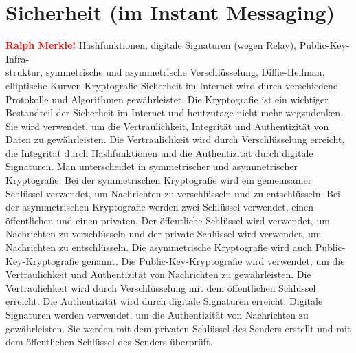 \section{Sicherheit (im Instant Messaging)}
\label{sec:sicherheit_im}
\textbf{\textcolor{red}{Ralph Merkle!}}
Hashfunktionen, digitale Signaturen (wegen Relay), Public-Key-Infra-\\struktur, symmetrische und asymmetrische Verschlüsselung, Diffie-Hellman, elliptische Kurven Kryptografie
Sicherheit im Internet wird durch verschiedene Protokolle und Algorithmen gewährleistet. Die Kryptografie ist ein wichtiger Bestandteil der Sicherheit im Internet und heutzutage nicht mehr wegzudenken. Sie wird verwendet, um die Vertraulichkeit, Integrität und Authentizität von Daten zu gewährleisten. Die Vertraulichkeit wird durch Verschlüsselung erreicht, die Integrität durch Hashfunktionen und die Authentizität durch digitale Signaturen. Man unterscheidet in symmetrischer und asymmetrischer Kryptografie. Bei der symmetrischen Kryptografie wird ein gemeinsamer Schlüssel verwendet, um Nachrichten zu verschlüsseln und zu entschlüsseln. Bei der asymmetrischen Kryptografie werden zwei Schlüssel verwendet, einen öffentlichen und einen privaten. Der öffentliche Schlüssel wird verwendet, um Nachrichten zu verschlüsseln und der private Schlüssel wird verwendet, um Nachrichten zu entschlüsseln. Die asymmetrische Kryptografie wird auch Public-Key-Kryptografie genannt.
Die Public-Key-Kryptografie wird verwendet, um die Vertraulichkeit und Authentizität von Nachrichten zu gewährleisten. Die Vertraulichkeit wird durch Verschlüsselung mit dem öffentlichen Schlüssel erreicht. Die Authentizität wird durch digitale Signaturen erreicht. Digitale Signaturen werden verwendet, um die Authentizität von Nachrichten zu gewährleisten. Sie werden mit dem privaten Schlüssel des Senders erstellt und mit dem öffentlichen Schlüssel des Senders überprüft. \\
